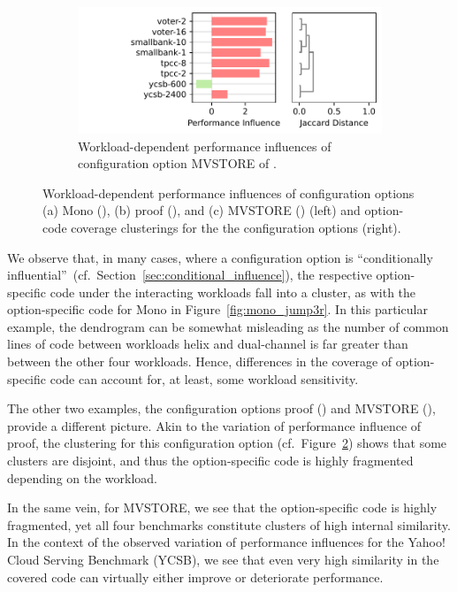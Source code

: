 {{{\begin{figure}
\begin{subfigure}{\linewidth}
		\hfill\includegraphics[width=0.925\linewidth]{images/h2.sens.pdf}
		\caption{Workload-dependent performance influences of configuration option \textsf{MVSTORE} of \htwo.}
		\label{fig:mvstore_h2}
	\end{subfigure}
	\caption{Workload-dependent performance influences of configuration options (a) \textsf{Mono} (\jumper), (b) \textsf{proof} (\zdrei), and (c) \textsf{MVSTORE} (\htwo) (left) and option-code coverage clusterings for the the configuration options (right).}
\end{figure}

We  observe that, in many cases, where  a configuration option is ``conditionally influential''~(cf.~Section~\ref{sec:conditional_influence}), the respective option-specific code under the interacting workloads fall into a cluster, as with the option-specific code for \textsf{Mono} in Figure~\ref{fig:mono_jump3r}. In this particular example, the dendrogram can be somewhat misleading as the number of common lines of code between workloads helix and dual-channel is far greater than between the other four workloads. Hence, differences in the coverage of option-specific code can account for, at least, some workload sensitivity.

The other two examples, the configuration options \textsf{proof} (\zdrei) and \textsf{MVSTORE} (\htwo), provide a different picture. Akin to the variation of performance influence of \textsf{proof}, the clustering for this configuration option (cf.~Figure~\ref{fig:mvstore_h2}) shows that some clusters are disjoint, and thus the option-specific code is highly fragmented depending on the workload. 

In the same vein, for \textsf{MVSTORE}, we see that the option-specific code is highly fragmented, yet all four benchmarks constitute clusters of high internal similarity. In the context of the observed variation of performance influences for the Yahoo! Cloud Serving Benchmark (YCSB), we see that even very high similarity in the covered code can virtually either improve or deteriorate performance.

}}}
